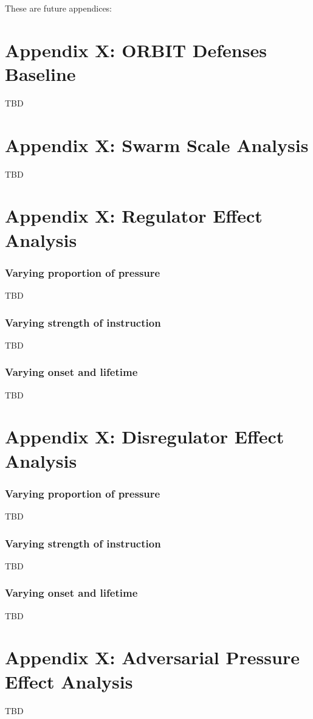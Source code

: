 These are future appendices:

\section*{Appendix X: ORBIT Defenses Baseline}
TBD

\section*{Appendix X: Swarm Scale Analysis}
TBD

\section*{Appendix X: Regulator Effect Analysis}
\subsubsection*{Varying proportion of pressure}
TBD
\subsubsection*{Varying strength of instruction}
TBD
\subsubsection*{Varying onset and lifetime}
TBD

\section*{Appendix X: Disregulator Effect Analysis}
\subsubsection*{Varying proportion of pressure}
TBD
\subsubsection*{Varying strength of instruction}
TBD
\subsubsection*{Varying onset and lifetime}
TBD

\section*{Appendix X: Adversarial Pressure Effect Analysis}
TBD
